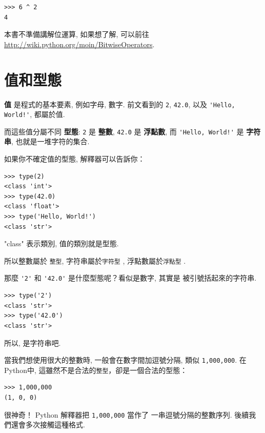 \documentclass[10pt]{book}
\begin{document}
\begin{verbatim}
>>> 6 ^ 2
4
\end{verbatim}
%

本書不準備講解位運算, 如果想了解, 可以前往 
\url{http://wiki.python.org/moin/BitwiseOperators}. 


\section{值和型態}


 {\bf 值} 是程式的基本要素, 例如字母, 數字. 前文看到的
 {\tt 2}, {\tt 42.0}, 以及 \verb"'Hello, World!'", 都屬於值. 

而這些值分屬不同 {\bf 型態}:
{\tt 2} 是 {\bf 整數}, 
{\tt 42.0} 是 {\bf 浮點數}, 
而 \verb"'Hello, World!'" 是 {\bf 字符串}, 也就是一堆字符的集合. 

如果你不確定值的型態, 解釋器可以告訴你：

\begin{verbatim}
>>> type(2)
<class 'int'>
>>> type(42.0)
<class 'float'>
>>> type('Hello, World!')
<class 'str'>
\end{verbatim}
%

"class" 表示類別, 值的類別就是型態. 


所以整數屬於 {\tt 整型}, 字符串屬於{\tt 字符型} , 浮點數屬於{\tt 浮點型} . 

那麼 \verb"'2'" 和 \verb"'42.0'" 是什麼型態呢？看似是數字, 其實是
被引號括起來的字符串. 

\begin{verbatim}
>>> type('2')
<class 'str'>
>>> type('42.0')
<class 'str'>
\end{verbatim}
%
所以, 是字符串吧. 

當我們想使用很大的整數時, 一般會在數字間加逗號分隔, 類似 {\tt 1,000,000}. 
在Python中, 這雖然不是合法的{\tt 整型}，卻是一個合法的型態：

\begin{verbatim}
>>> 1,000,000
(1, 0, 0)
\end{verbatim}
%

很神奇！ Python 解釋器把 {\tt 1,000,000} 當作了
一串逗號分隔的整數序列. 後續我們還會多次接觸這種格式. 
\end{document}
